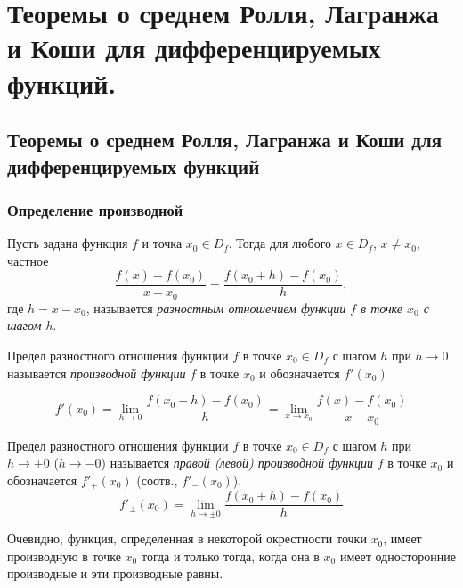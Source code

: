 \chapter{Теоремы о среднем Ролля, Лагранжа и Коши для дифференцируемых функций.}


\section{Теоремы о среднем Ролля, Лагранжа и Коши для дифференцируемых функций}

\subsection{Определение производной}

Пусть задана функция $f$ и точка $x_0\in D_f$. Тогда для любого $x \in D_f$, $x\ne x_0$, частное
\begin{equation}\label{ya3e1}
\frac{f(x)-f(x_0)}{x-x_0}=\frac{f(x_0+h)-f(x_0)}{h}, 
\end{equation}
где $h=x-x_0$, называется \textit{разностным отношением функции $f$ в точке $x_0$ с шагом $h$}.

\begin{defn}
\label{ya3d1}
Предел разностного отношения функции $f$ в точке $x_0 \in D_f$ с шагом $h$ при $h \to 0$ называется \textit{производной функции} $f$ в точке $x_0$ и обозначается $f'(x_0)$

\begin{equation}\label{ya3e2}
f'(x_0)=\lim_{h\to 0}\limits\frac{f(x_0+h)-f(x_0)}{h}=\lim_{x\to x_0}\limits \frac{f(x)-f(x_0)}{x-x_0}
\end{equation}

\end{defn}
\begin{defn} Предел разностного отношения функции $f$ в точке $x_0 \in D_f$ с шагом $h$ при $h \to +0 $ ($h \to -0$) называется \textit{правой \textup{(}левой\textup{)} производной функции} $f$ в точке $x_0$ и обозначается $f'_+(x_0)$ (соотв., $f'_-(x_0)$).
\begin{equation}\label{ya3e3}
f'_\pm(x_0)=\lim_{h\to \pm0}\limits\frac{f(x_0+h)-f(x_0)}{h}
\end{equation}
\end{defn}

Очевидно, функция, определенная в некоторой окрестности точки $x_0$, имеет производную в точке $x_0$ тогда и только тогда, когда она в $x_0$ имеет односторонние производные и эти производные равны.


